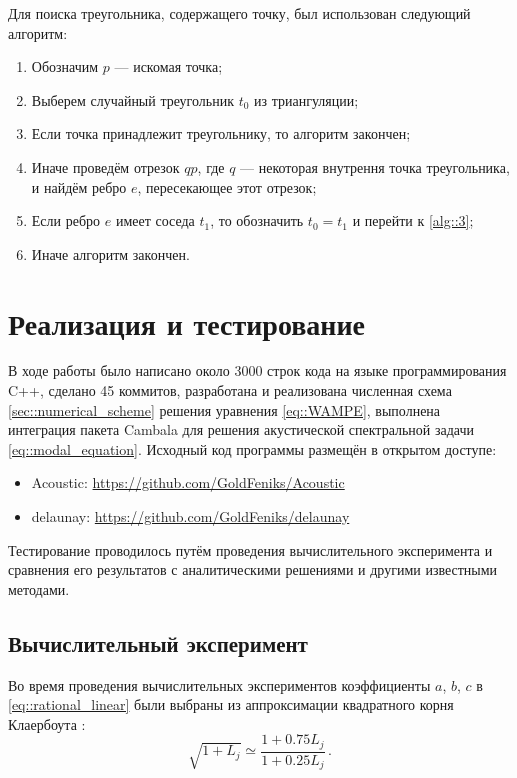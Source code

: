 \documentclass{fefu}
\begin{document}
            \newpage
            \par Для поиска треугольника, содержащего точку, был использован следующий алгоритм:
            \begin{enumerate}
                \item Обозначим $p$ --- искомая точка;
                \item Выберем случайный треугольник $t_0$ из триангуляции;
                \item \label{alg::3}Если точка принадлежит треугольнику, то алгоритм закончен;
                \item Иначе проведём отрезок $qp$, где $q$ --- некоторая внутрення точка треугольника, и найдём ребро $e$, пересекающее этот отрезок;
                \item Если ребро $e$ имеет соседа $t_1$, то обозначить $t_0=t_1$ и перейти к \ref{alg::3};
                \item Иначе алгоритм закончен.
            \end{enumerate}
    \section{Реализация и тестирование}
        \par В ходе работы было написано около 3000 строк кода на языке программирования C++, сделано 45 коммитов, разработана и реализована численная схема \ref{sec::numerical_scheme} решения уравнения \eqref{eq::WAMPE}, выполнена интеграция пакета Cambala для решения акустической спектральной задачи \eqref{eq::modal_equation}. Исходный код программы размещён в открытом доступе:
        \begin{itemize}
            \item \textsf{Acoustic}: \url{https://github.com/GoldFeniks/Acoustic}
            \item \textsf{delaunay}: \url{https://github.com/GoldFeniks/delaunay}
        \end{itemize}
        \par Тестирование проводилось путём проведения вычислительного эксперимента и сравнения его результатов с аналитическими решениями и другими известными методами.
        \subsection{Вычислительный эксперимент}
            \par Во время проведения вычислительных экспериментов коэффициенты $a$, $b$, $c$ в \eqref{eq::rational_linear} были выбраны из аппроксимации квадратного корня Клаербоута \cite{jensen}:
            \begin{equation}
                \sqrt{1+L_j}\simeq\frac{1+0.75L_j}{1+0.25L_j}\,.
            \end{equation}
\end{document}
